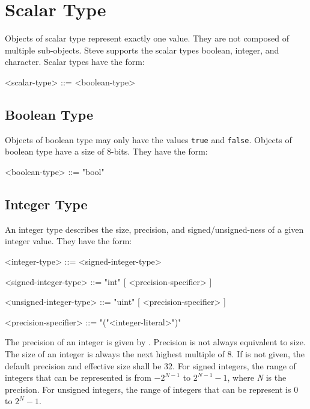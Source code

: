\section{Scalar Type} \label{guide:scalar_type}

Objects of scalar type represent exactly one value. They are not composed of multiple sub-objects. Steve supports the scalar types boolean, integer, and character. Scalar types have the form:

\begin{minip}
\begin{grammar}
<scalar-type> ::= <boolean-type>
\end{grammar}
\end{minip}

\subsection{Boolean Type} \label{guide:bool_type}

Objects of boolean type may only have the values \texttt{true} and \texttt{false}. Objects of boolean type have a size of 8-bits. They have the form:

\begin{minip}
\begin{grammar}
<boolean-type> ::= "bool"
\end{grammar}
\end{minip}

\subsection{Integer Type} \label{guide:integer_type}

An integer type describes the size, precision, and signed/unsigned-ness of a given integer value. They have the form:

\begin{minip}
\begin{grammar}
<integer-type> ::= <signed-integer-type>

<signed-integer-type> ::= "int" [ <precision-specifier> ]

<unsigned-integer-type> ::= "uint" [ <precision-specifier> ]

<precision-specifier> ::= "("<integer-literal>")"
\end{grammar}
\end{minip}

The precision of an integer is given by .
Precision is not always equivalent to size. The size of an integer is
always the next highest multiple of 8.
If  is not given, the default precision and effective size shall be 32. For signed integers, the range of integers that can be represented is from $-2^{N-1}$ to $2^{N-1}-1$, where \textit{N} is the precision. For unsigned integers, the range of integers that can be represent is $0$ to $2^{N}-1$.

